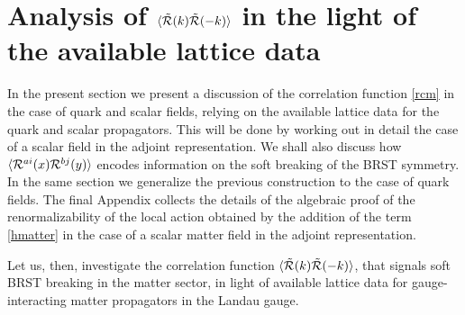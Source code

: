 \section{Analysis of $\langle {\tilde {\cal R}}(k) {\tilde {\cal R}}(-k) \rangle$ in the light
of the available lattice data}
\label{latticefit}



In the present section we present a discussion of the correlation function \eqref{rcm}  in
the case of  quark and scalar fields, relying on the available lattice data for the quark and
scalar propagators. This will be done by working out in detail the case of a scalar field in
the adjoint representation. We shall also discuss how $\langle {\cal R}^{ai}(x)  {\cal
R}^{bj}(y)  \rangle $ encodes information on the soft  breaking of the BRST symmetry. In the
same section we generalize the previous construction  to the case of quark fields. The final Appendix collects  the details of the algebraic proof of
the renormalizability of the local action obtained by the addition of the term  \eqref{hmatter}
in the case of a scalar matter field in the adjoint representation.  


Let us, then, investigate the correlation function $\langle {\tilde {\cal R}}(k) {\tilde {\cal R}}(-k) \rangle$, that signals soft BRST breaking in the matter sector, in  light of available lattice data for gauge-interacting matter propagators in the Landau gauge.

